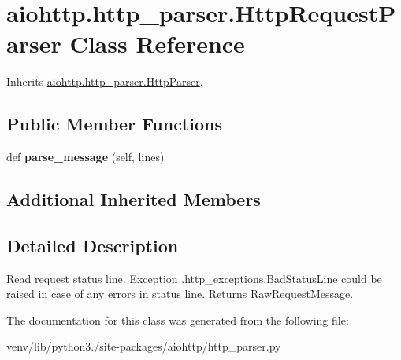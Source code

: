\hypertarget{classaiohttp_1_1http__parser_1_1_http_request_parser}{}\section{aiohttp.\+http\+\_\+parser.\+Http\+Request\+Parser Class Reference}
\label{classaiohttp_1_1http__parser_1_1_http_request_parser}


Inherits \hyperlink{classaiohttp_1_1http__parser_1_1_http_parser}{aiohttp.\+http\+\_\+parser.\+Http\+Parser}.

\subsection*{Public Member Functions}
\begin{DoxyCompactItemize}
\item 
\mbox{\label{classaiohttp_1_1http__parser_1_1_http_request_parser_ab0f5e7b55e771103da94de393f0b7a51}} 
def {\bfseries parse\+\_\+message} (self, lines)
\end{DoxyCompactItemize}
\subsection*{Additional Inherited Members}


\subsection{Detailed Description}
\begin{DoxyVerb}Read request status line. Exception .http_exceptions.BadStatusLine
could be raised in case of any errors in status line.
Returns RawRequestMessage.
\end{DoxyVerb}
 

The documentation for this class was generated from the following file\+:\begin{DoxyCompactItemize}
\item 
venv/lib/python3./site-\/packages/aiohttp/http\+\_\+parser.\+py\end{DoxyCompactItemize}
